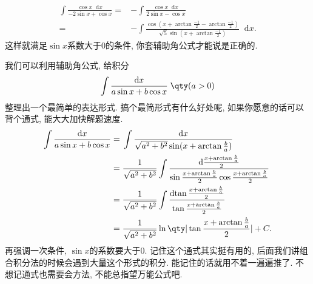 \documentclass{ctexbook}
\newcommand*{\dif}{\mathop{}\!\mathrm{d}}
\begin{document}
{\begin{align*}
\int\frac{\cos{x}\dif{x}}{-2\sin{x}+\cos{x}}={}&-\int\frac{\cos{x}\dif{x}}{2\sin{x}-\cos{x}}\\
={}&-\int\frac{\cos(x+\arctan{\frac{-1}{2}}-\arctan{\frac{-1}{2}})}{\sqrt{5}\sin(x+\arctan{\frac{-1}{2}})}\dif{x}
.\end{align*}
这样就满足$\sin{x}$系数大于$0$的条件, 你套辅助角公式才能说是正确的. \par
我们可以利用辅助角公式, 给积分
\begin{align*}
\int\frac{\dif{x}}{a\sin{x}+b\cos{x}}\;\qty(a>0)
\end{align*}
整理出一个最简单的表达形式. 搞个最简形式有什么好处呢, 如果你愿意的话可以背个通式, 能大大加快解题速度. 
\begin{align*}
\int\frac{\dif{x}}{a\sin{x}+b\cos{x}}={}&\int\frac{\dif{x}}{\sqrt{a^{2}+b^{2}}\sin(x+\arctan{\frac{b}{a}})}\\
={}&\frac{1}{\sqrt{a^{2}+b^{2}}}\int\frac{\dif{\frac{x+\arctan{\frac{b}{a}}}{2}}}{\sin{\frac{x+\arctan{\frac{b}{a}}}{2}}\cos{\frac{x+\arctan{\frac{b}{a}}}{2}}}\\
={}&\frac{1}{\sqrt{a^{2}+b^{2}}}\int\frac{\dif{\tan{\frac{x+\arctan{\frac{b}{a}}}{2}}}}{\tan{\frac{x+\arctan{\frac{b}{a}}}{2}}}\\
={}&\frac{1}{\sqrt{a^{2}+b^{2}}}\ln\qty|\tan{\frac{x+\arctan{\frac{b}{a}}}{2}}|+C
.\end{align*}
再强调一次条件, $\sin{x}$的系数要大于$0$. 记住这个通式其实挺有用的, 后面我们讲组合积分法的时候会遇到大量这个形式的积分. 能记住的话就用不着一遍遍推了. 不想记通式也需要会方法, 不能总指望万能公式吧. \par
}
\end{document}
